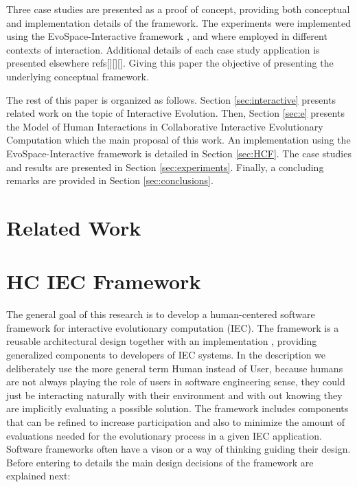 Three case studies are presented as a proof of concept, providing both
conceptual and implementation details of the framework. 
The experiments were implemented using the EvoSpace-Interactive framework \cite{garcia2013evospace}, 
and where employed in different contexts of interaction. 
Additional details of each case study application is presented elsewhere refs[][][]. 
Giving this paper the objective of presenting the underlying conceptual framework.     

The rest of this paper is organized as follows.
Section \ref{sec:interactive} presents related work on the topic 
of Interactive Evolution.
Then, Section \ref{sec:e} presents the Model of Human Interactions in Collaborative Interactive 
 Evolutionary Computation which 
the main proposal of this work. An implementation using the EvoSpace-Interactive  framework is detailed in Section \ref{sec:HCF}.
The case studies  and results are presented in Section \ref{sec:experiments}.
Finally, a concluding remarks are provided in Section \ref{sec:conclusions}.

\section{Related Work}

\section{HC  IEC Framework}
The general goal of this research is to develop a human-centered \cite{gasson2003human} 
software framework for interactive evolutionary computation (IEC). 
The framework is a reusable architectural design together with an implementation \cite{campbell1991choices}, 
providing generalized components to developers of IEC systems. In the description we deliberately use the more general 
term Human instead of User, because humans are not always playing the role of users in software engineering sense, they
could just be interacting naturally with their environment and with out knowing they are implicitly
evaluating a possible solution. The framework includes components that can be refined to increase
participation and also to minimize the amount of evaluations needed for the evolutionary process in a given IEC application. Software frameworks often have a vison or a way of thinking \cite{carneiro2010introducing} guiding their
design. Before entering to details the main design decisions of the framework are explained next:  

